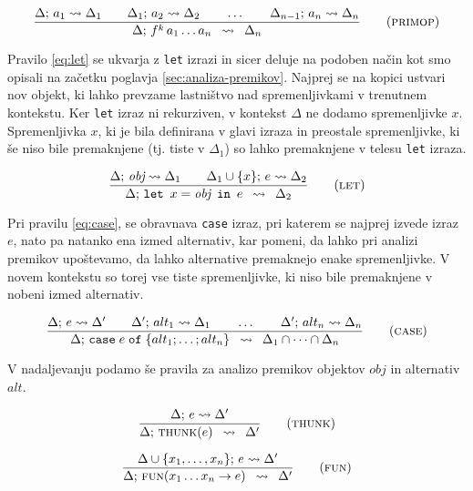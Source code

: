 \begin{equation}
\infers[primop]{
    \Delta; \, a_1 \leadsto \Delta_1 \qquad \Delta_1; \, a_2 \leadsto \Delta_2 \qquad\dots \qquad \Delta_{n-1}; \, a_n \leadsto \Delta_n
}{
    \Delta; \, f^k \, a_1 \dots a_n
}{
	\Delta_n
}
\label{eq:primop}
\end{equation}

Pravilo \ref{eq:let} se ukvarja z \texttt{let} izrazi in sicer deluje na podoben način kot smo opisali na začetku poglavja \ref{sec:analiza-premikov}. Najprej se na kopici ustvari nov objekt, ki lahko prevzame lastništvo nad spremenljivkami v trenutnem kontekstu. Ker \texttt{let} izraz ni rekurziven, v kontekst $\Delta$ ne dodamo spremenljivke $x$. Spremenljivka $x$, ki je bila definirana v glavi izraza in preostale spremenljivke, ki še niso bile premaknjene (tj. tiste v $\Delta_1$) so lahko premaknjene v telesu \texttt{let} izraza.

\begin{equation}
\infers[let]{
    \Delta; \, \textit{obj} \leadsto \Delta_1
    \qquad
    \Delta_1 \cup \{ x \}; \, e \leadsto \Delta_2
}{
    \Delta; \, \texttt{let} \enspace x = \textit{obj} \enspace \texttt{in} \enspace e
}{
	\Delta_2
}
\label{eq:let}
\end{equation}

Pri pravilu \ref{eq:case}, se obravnava \texttt{case} izraz, pri katerem se najprej izvede izraz $e$, nato pa natanko ena izmed alternativ, kar pomeni, da lahko pri analizi premikov upoštevamo, da lahko alternative premaknejo enake spremenljivke. V novem kontekstu so torej vse tiste spremenljivke, ki niso bile premaknjene v nobeni izmed alternativ.

\begin{equation}
\infers[case]{
    \Delta; \, e \leadsto \Delta' \qquad \Delta'; \, alt_1 \leadsto \Delta_1 \qquad \dots \qquad \Delta'; \, alt_n \leadsto \Delta_n
}{
    \Delta; \, \texttt{case} \; e \; \texttt{of} \; \{ alt_1; \dots; alt_n \}
}{
	\Delta_1 \cap \dots \cap \Delta_n
}
\label{eq:case}
\end{equation}

V nadaljevanju podamo še pravila za analizo premikov objektov $obj$ in alternativ $alt$.

\begin{equation}
\infers[thunk]{
    \Delta; \, e \leadsto \Delta'
}{
    \Delta; \, \textsc{thunk}(e)
}{
	\Delta'
}
\label{eq:thunk}
\end{equation}

\begin{equation}
\infers[fun]{
    \Delta \cup \{ x_1, \dots, x_n \}; \, e \leadsto \Delta'
}{
    \Delta; \, \textsc{fun}(x_1 \dots x_n \to e)
}{
	\Delta'
}
\label{eq:fun}
\end{equation}

